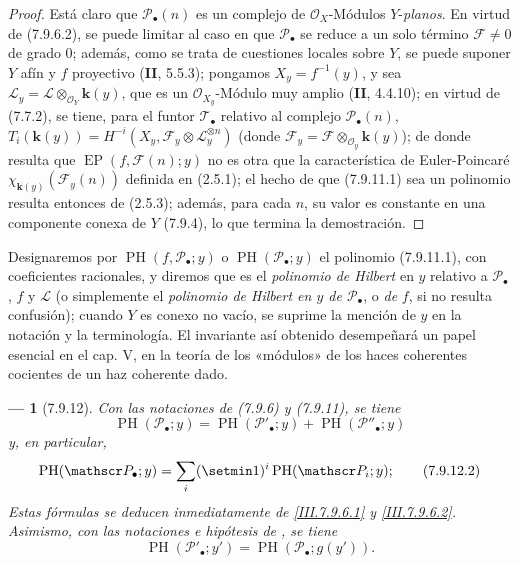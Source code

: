 \documentclass[10pt,oneside,openany]{book}
\theoremstyle{egaenv}\newtheorem*{env}{---}
\theoremstyle{egastatement}
\theoremstyle{egadescription}
\begin{document}
\begin{proof}
Está claro que $\mathscr P_\bullet(n)$ es un complejo de
$\mathscr O_X$-Módulos $Y$-\emph{planos}. En virtud de (7.9.6.2), se puede limitar al caso
en que $\mathscr P_\bullet$ se reduce a un solo término $\mathscr F\ne0$ de grado 0;
además, como se trata de cuestiones locales sobre $Y$, se puede suponer $Y$
afín y $f$ proyectivo (\textbf{II}, 5.5.3); pongamos $X_y=f^{-1}(y)$, y sea
$\mathscr L_y=\mathscr L\otimes_{\mathscr O_Y}\boldsymbol{k}(y)$, que es un
$\mathscr O_{X_y}$-Módulo muy amplio (\textbf{II}, 4.4.10); en virtud de (7.7.2), se tiene,
para el funtor $\mathscr T_\bullet$ relativo al complejo
$\mathscr P_\bullet(n)$, $T_i(\boldsymbol{k}(y))=H^{-i}(X_y,\mathscr F_y\otimes\mathscr L_y^{\otimes n})$
(donde $\mathscr F_y=\mathscr F\otimes_{\mathscr O_y}\boldsymbol{k}(y)$);
de donde resulta que $\operatorname{EP}(f,\mathscr F(n);y)$ no es otra que la
característica de Euler-Poincaré $\chi_{\mathbf{k}(y)}(\mathscr F_y(n))$ definida en
(2.5.1); el hecho de que (7.9.11.1) sea un polinomio resulta entonces de (2.5.3);
además, para cada $n$, su valor es constante en una componente conexa de
$Y$ (7.9.4), lo que termina la demostración.
\end{proof}

Designaremos por $\operatorname{PH}(f,\mathscr P_\bullet;y)$ o
$\operatorname{PH}(\mathscr P_\bullet;y)$ el polinomio (7.9.11.1), con coeficientes
racionales, y diremos que es el \emph{polinomio de Hilbert} en $y$
relativo a $\mathscr P_\bullet$, $f$ y $\mathscr L$ (o simplemente el
\emph{polinomio de Hilbert en $y$ de $\mathscr P_\bullet$}, o \emph{de} $f$, si no
resulta confusión); cuando $Y$ es conexo no vacío, se suprime la
mención de $y$ en la notación y la terminología. El invariante así obtenido
desempeñará un papel esencial en el cap. V, en la teoría de los «módulos» de los
haces coherentes cocientes de un haz coherente dado.

\begin{env}[7.9.12]
\label{III.7.9.12.fr}
Con las notaciones de (7.9.6) y (7.9.11), se tiene
\[
  \operatorname{PH}(\mathscr P_\bullet;y)
  =\operatorname{PH}(\mathscr P'_\bullet;y)
  +\operatorname{PH}(\mathscr P''_\bullet;y)
  \tag{7.9.12.1}\label{III.7.9.12.1.fr}
\]
y, en particular,
\[
  \operatorname{PH}(\mathscr P_\bullet;y)
  =\sum_i(\setmin 1)^i\operatorname{PH}(\mathscr P_i;y) ;
  \tag{7.9.12.2}\label{III.7.9.12.2.fr}
\]
Estas fórmulas se deducen inmediatamente de
\eqref{III.7.9.6.1} y \eqref{III.7.9.6.2}. Asimismo, con las
notaciones e hipótesis de , se tiene
\[
  \operatorname{PH}(\mathscr P'_\bullet;y')
  =\operatorname{PH}(\mathscr P_\bullet;g(y')).
  \tag{7.9.12.3}\label{III.7.9.12.3.fr}
\]
\end{env}
\end{document}

